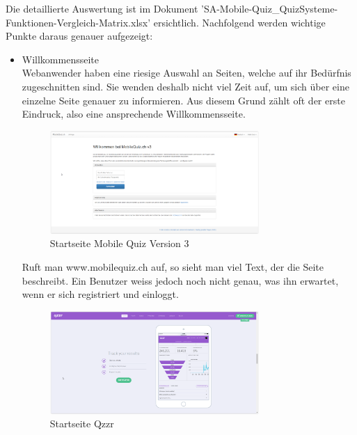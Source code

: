 	\bigskip
	
	Die detaillierte Auswertung ist im Dokument 'SA-Mobile-Quiz\_QuizSysteme-Funktionen-Vergleich-Matrix.xlsx' ersichtlich. Nachfolgend werden wichtige Punkte daraus genauer aufgezeigt:
	
	\begin{itemize}
		\item Willkommensseite \\
		Webanwender haben eine riesige Auswahl an Seiten, welche auf ihr Bedürfnis zugeschnitten sind. Sie wenden deshalb nicht viel Zeit auf, um sich über eine einzelne Seite genauer zu informieren. Aus diesem Grund zählt oft der erste Eindruck, also eine ansprechende Willkommensseite. \\
		
		\begin{figure}[H]
			\centering
			\includegraphics[width=0.75\textwidth]{Images/MobileQuiz_StartPage.PNG}
			\caption{Startseite Mobile Quiz Version 3}
		\end{figure}
		
		Ruft man www.mobilequiz.ch auf, so sieht man viel Text, der die Seite beschreibt. Ein Benutzer weiss jedoch noch nicht genau, was ihn erwartet, wenn er sich registriert und einloggt.
		
		\begin{figure}[H]
			\centering
			\includegraphics[width=0.75\textwidth]
			{Images/Qzzr_StartPage_Statistics.PNG}
			\caption{Startseite Qzzr}
		\end{figure}
				

\end{itemize}
